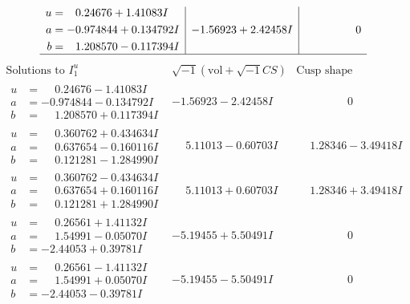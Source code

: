 \documentclass[1p]{elsarticle_modified}
\theoremstyle{definition}
\newcommand{\I}{\sqrt{-1}}
\begin{document}
$$\begin{array}{c|c|c}
\begin{aligned}
u &= \phantom{-}0.24676 + 1.41083 I \\
a &= -0.974844 + 0.134792 I \\
b &= \phantom{-}1.208570 - 0.117394 I\end{aligned}
 & -1.56923 + 2.42458 I & \phantom{-0.000000 } 0\\
 \hline 
 \end{array}$$\newpage$$\begin{array}{c|c|c}  
\text{Solutions to }I^u_{1}& \I (\text{vol} + \sqrt{-1}CS) & \text{Cusp shape}\\
 \hline 
\begin{aligned}
u &= \phantom{-}0.24676 - 1.41083 I \\
a &= -0.974844 - 0.134792 I \\
b &= \phantom{-}1.208570 + 0.117394 I\end{aligned}
 & -1.56923 - 2.42458 I & \phantom{-0.000000 } 0 \\ \hline\begin{aligned}
u &= \phantom{-}0.360762 + 0.434634 I \\
a &= \phantom{-}0.637654 - 0.160116 I \\
b &= \phantom{-}0.121281 - 1.284990 I\end{aligned}
 & \phantom{-}5.11013 - 0.60703 I & \phantom{-}1.28346 - 3.49418 I \\ \hline\begin{aligned}
u &= \phantom{-}0.360762 - 0.434634 I \\
a &= \phantom{-}0.637654 + 0.160116 I \\
b &= \phantom{-}0.121281 + 1.284990 I\end{aligned}
 & \phantom{-}5.11013 + 0.60703 I & \phantom{-}1.28346 + 3.49418 I \\ \hline\begin{aligned}
u &= \phantom{-}0.26561 + 1.41132 I \\
a &= \phantom{-}1.54991 - 0.05070 I \\
b &= -2.44053 + 0.39781 I\end{aligned}
 & -5.19455 + 5.50491 I & \phantom{-0.000000 } 0 \\ \hline\begin{aligned}
u &= \phantom{-}0.26561 - 1.41132 I \\
a &= \phantom{-}1.54991 + 0.05070 I \\
b &= -2.44053 - 0.39781 I\end{aligned}
 & -5.19455 - 5.50491 I & \phantom{-0.000000 } 0 \\ \hline\begin{aligned}

\end{aligned}
\end{array}$$
\end{document}
